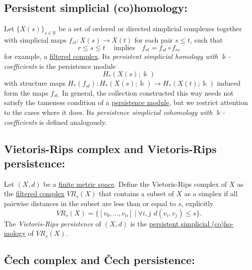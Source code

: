 \documentclass{amsart}
\begin{document}
	\subsection*{Persistent simplicial (co)homology:} \label{persistent simplicial (co)homology}
	
	Let $\{X(s)\}_{s \in \mathbb R} $ be a set of ordered or directed simplicial complexes together with simplicial maps $f_{st} : X(s) \to X(t)$ for each pair $s \leq t$, such that 
	\begin{equation*}
	r \leq s \leq t\ \quad\text{implies} \quad f_{rt} = f_{st} \circ f_{rs}
	\end{equation*}
	for example, a \hyperref[filtered complex]{filtered complex}. Its \textit{persistent simplicial homology with $\Bbbk$-coefficients} is the persistence module
	\begin{equation*}
	H_*(X(s); \Bbbk)
	\end{equation*}
	with structure maps $H_*(f_{st}) : H_*(X(s); \Bbbk) \to H_*(X(t); \Bbbk)$ induced form the maps $f_{st.}$ In general, the collection constructed this way needs not satisfy the tameness condition of a \hyperref[persistence module]{persistence module}, but we restrict attention to the cases where it does. Its \textit{persistence simplicial cohomology with $\Bbbk$-coefficients} is defined analogously.
	
	\subsection*{Vietoris-Rips complex and Vietoris-Rips persistence:} \label{vietoris-rips complex and vietoris-rips persistence}
	
	Let $(X, d)$ be a \hyperref[finite metric spaces and point clouds]{finite metric space}. Define the Vietoris-Rips complex of $X$ as the \hyperref[filtered complex]{filtered complex} $VR_s(X)$ that contains a subset of $X$ as a simplex if all pairwise distances in the subset are less than or equal to $s$, explicitly
	\begin{equation*}
	VR_s(X) = \Big\{ [v_0,\dots,v_n]\ \Big|\ \forall i,j\ \,d(v_i, v_j) \leq s \Big\}.
	\end{equation*}
	The \textit{Vietoris-Rips persistence} of $(X, d)$ is the \hyperref[persistent simplicial (co)homology]{persistent simplicial (co)ho-mology} of $VR_s(X)$.
	
	\subsection*{\v{C}ech complex and \v{C}ech persistence:} \label{cech complex and cech persistence}
	
\end{document}
